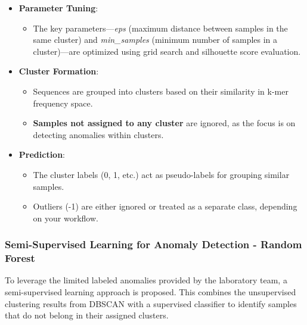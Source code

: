 \begin{itemize}
    \item \textbf{Parameter Tuning}:
    \begin{itemize}
        \item The key parameters—\textit{eps} (maximum distance between samples in the same cluster) and \textit{min\_samples} (minimum number of samples in a cluster)—are optimized using grid search and silhouette score evaluation.
    \end{itemize}

    \item \textbf{Cluster Formation}:
    \begin{itemize}
        \item Sequences are grouped into clusters based on their similarity in k-mer frequency space.
        \item \textbf{Samples not assigned to any cluster} are ignored, as the focus is on detecting anomalies within clusters.
    \end{itemize}

    \item \textbf{Prediction}:
    \begin{itemize}
        \item The cluster labels (0, 1, etc.) act as pseudo-labels for grouping similar samples.
        \item Outliers (-1) are either ignored or treated as a separate class, depending on your workflow.
    \end{itemize}
\end{itemize}

\subsubsection{Semi-Supervised Learning for Anomaly Detection - Random Forest}
To leverage the limited labeled anomalies provided by the laboratory team, a semi-supervised learning approach is proposed. This combines the unsupervised clustering results from DBSCAN with a supervised classifier to identify samples that do not belong in their assigned clusters.

